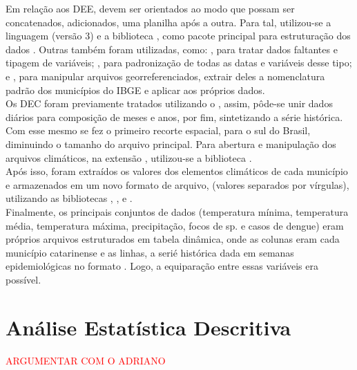 Em relação aos \acrshort{DEE}, devem ser orientados ao modo que possam ser concatenados, adicionados, uma planilha após a outra. Para tal, utilizou-se a linguagem  (versão 3) \cite{python3_2009_van}  e a biblioteca  \cite{pandas_2010_scipy, pandas_2020_reback}, como pacote principal para estruturação dos dados . Outras também foram utilizadas, como:  \cite{numpy_2020_harrisarray}, para tratar dados faltantes e tipagem de variáveis;  \cite{python2_1995_van}, para padronização de todas as datas e variáveis desse tipo; e  \cite{geopandas_2020_kelseyjordahl}, para manipular arquivos georreferenciados, extrair deles a nomenclatura padrão dos municípios do \acrshort{IBGE} e aplicar aos próprios dados.\\
\indent Os \acrshort{DEC} foram previamente tratados utilizando o  \cite{CDO_2023_schulzweida}, assim, pôde-se unir dados diários para composição de meses e anos, por fim, sintetizando a série histórica. Com esse mesmo  se fez o primeiro recorte espacial, para o sul do Brasil, diminuindo o tamanho do arquivo principal. Para abertura e manipulação dos arquivos climáticos, na extensão , utilizou-se a biblioteca  \cite{xarray_2016_v0_8_0, xarray_2017_hoyer}.\\
\indent Após isso, foram extraídos os valores dos elementos climáticos de cada município e armazenados em um novo formato de arquivo,  (valores separados por vírgulas), utilizando as bibliotecas , ,  e  \cite{shapely_2007_gillies}.\\
\indent Finalmente,  os principais conjuntos de dados (temperatura mínima, temperatura média, temperatura máxima, precipitação, focos de  sp. e casos de dengue) eram próprios arquivos estruturados em tabela dinâmica, onde as colunas eram cada município catarinense e as linhas, a serié histórica dada em semanas epidemiológicas no formato . Logo, a equiparação entre essas variáveis era possível.


\section{Análise Estatística Descritiva}

\indent \textcolor{red}{ARGUMENTAR COM O ADRIANO}\\

